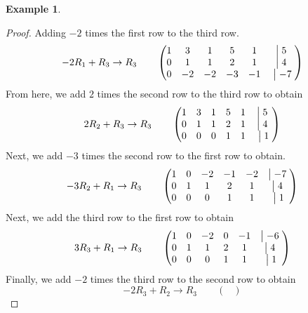 \documentclass[a4paper]{article}
\theoremstyle{definition}
\newtheorem*{eg}{Example}
\begin{document}
\begin{eg}
\begin{proof}
     Adding $-2$ times the first row to the third row.
     \begin{equation*}
          -2R_1 + R_3 \rightarrow R_3 \qquad
          \begin{pmatrix}
               1 & 3 & 1 & 5 & 1 &\bigm|  5\; \\
               0 & 1 & 1 & 2 & 1 &\bigm|  4\; \\ 
               0 & -2 & -2 & -3 & -1 &\;\bigm|  -7 \;
           \end{pmatrix}
     \end{equation*}
     From here, we add $2$ times the second row to the third row to obtain
     \begin{equation*}
          2R_2 + R_3 \rightarrow R_3 \qquad
          \begin{pmatrix}
               1 & 3 & 1 & 5 & 1 &\bigm|  5\; \\
               0 & 1 & 1 & 2 & 1 &\bigm|  4\; \\ 
               0 & 0 & 0 & 1 & 1 &\;\bigm|  1 \;
          \end{pmatrix}
     \end{equation*}
     Next, we add $-3$ times the second row to the first row to obtain.
     \begin{equation*}
          -3R_2 + R_1 \rightarrow R_3 \qquad
          \begin{pmatrix}
               1 & 0 & -2 & -1 & -2 &\bigm|  -7\; \\
               0 & 1 & 1 & 2 & 1 &\bigm|  4\; \\ 
               0 & 0 & 0 & 1 & 1 &\;\bigm|  1 \;
          \end{pmatrix}
     \end{equation*}
     Next, we add the third row to the first row to obtain
     \begin{equation*}
          3R_3 + R_1 \rightarrow R_3 \qquad
          \begin{pmatrix}
               1 & 0 & -2 & 0 & -1 &\bigm|  -6\; \\
               0 & 1 & 1 & 2 & 1 &\bigm|  4\; \\ 
               0 & 0 & 0 & 1 & 1 &\;\bigm|  1 \;
          \end{pmatrix}
     \end{equation*}
     Finally, we add $-2$ times the third row to the second row to obtain
     \begin{equation*}
          -2R_3 + R_2 \rightarrow R_3 \qquad
          \begin{pmatrix}

\end{pmatrix}
\end{equation*}
\end{proof}
\end{eg}
\end{document}

